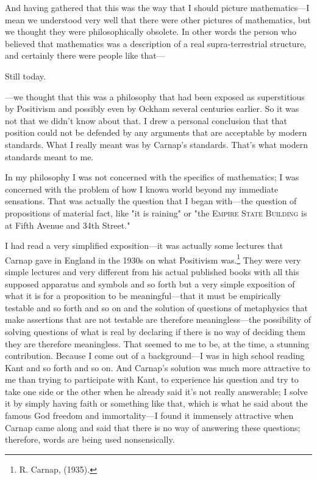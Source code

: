 And having gathered that this was the way that I should picture 
mathematics---I mean we understood very well that there were other 
pictures of mathematics, but we thought they were philosophically 
obsolete. In other words the person who believed that mathematics was 
a description of a real supra-terrestrial structure, and certainly there 
were people like that--- 

 Still today. 

 ---we thought that this was a philosophy that had been 
exposed as superstitious by Positivism and possibly even by Ockham 
several centuries earlier. So it was not that we didn't know about that. I 
drew a personal conclusion that that position could not be defended by 
any arguments that are acceptable by modern standards. What I really 
meant was by Carnap's standards. That's what modern standards 
meant to me. 

In my philosophy I was not concerned with the specifics of 
mathematics; I was concerned with the problem of how I knowa world 
beyond my immediate sensations. That was actually the question that I 
began with---the question of propositions of material fact, like "it is raining" 
or "the \textsc{Empire State Building} is at Fifth Avenue and 34th Street." 

I had read a very simplified exposition---it was actually some 
lectures that Carnap gave in England in the 1930s on what Positivism 
was.\footnote{R. Carnap,  (1935).} 
They were very simple lectures and very different from his actual 
published books with all this supposed apparatus and symbols and so 
forth but a very simple exposition of what it is for a proposition to be 
meaningful---that it must be empirically testable and so forth and so on 
and the solution of questions of metaphysics that make assertions that 
are not testable are therefore meaningless---the possibility of solving 
questions of what is real by declaring if there is no way of deciding them 
they are therefore meaningless. That seemed to me to be, at the time, a 
stunning contribution. Because I come out of a background---I was in 
high school reading Kant and so forth and so on. And Carnap's 
solution was much more attractive to me than trying to participate with 
Kant, to experience his question and try to take one side or the other 
when he already said it's not really answerable; I solve it by simply 
having faith or something like that, which is what he said about the 
famous God freedom and immortality---I found it immensely attractive 
when Carnap came along and said that there is no way of answering 
these questions; therefore, words are being used nonsensically. 

